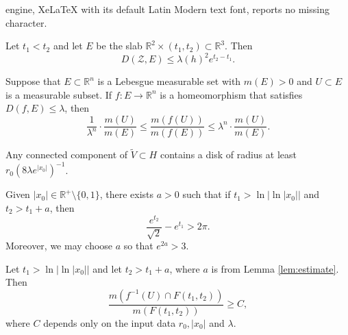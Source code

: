 \documentclass[10pt,a4paper]{amsart}
\newcommand{\R}{\mathbb{R}}
\begin{document}
engine, XeLaTeX with its default Latin Modern text font, reports no missing character.
\begin{lemma}
\label{lem:4}
Let $t_1<t_2$ and let $E$ be the slab $\R^2 \times (t_1,t_2) \subset \R^3$. Then 
\[ D(\mathcal{Z} , E) \leq \lambda(h)^2 e^{t_2-t_1}.\]
\end{lemma}

\begin{proposition}
    \label{prop:reldist}
Suppose that $E\subset \R^n$ is a Lebesgue measurable set with $m(E) > 0$ and $U \subset E$ is a measurable subset. If $f:E \to \R^n$ is a homeomorphism that satisfies $D(f,E) \leq \lambda$, then 
\[ \frac{1}{\lambda^n} \cdot \frac{m(U)}{m(E)} \leq \frac{ m(f(U))}{m(f(E))} \leq \lambda^n \cdot \frac{ m(U)}{m(E)}.  \]
\end{proposition}

\begin{lemma}
    \label{lem:radius}
Any connected component of $\widetilde{V} \subset H$ contains a disk of radius at least $r_0(8\lambda e^{|x_0|})^{-1}$.
\end{lemma}

\begin{lemma}
    \label{lem:estimate}
Given $|x_0| \in \R^+ \setminus  \{ 0 ,1 \}$, there exists $a>0$ such that if $t_1 > \ln \left |\ln |x_0| \right |$ and $t_2 > t_1+a$, then 
\[ \frac{e^{t_2}}{\sqrt{2}} - e^{t_1} > 2\pi .\]
Moreover, we may choose $a$ so that $e^{2a}>3$.
\end{lemma}

\begin{lemma}
\label{lem:doublepreims}
Let $t_1 > \ln \left |\ln |x_0| \right |$ and let $t_2 > t_1+a $, where $a$ is from Lemma \ref{lem:estimate}. Then 
\[ \frac{ m(f^{-1}(U) \cap F(t_1,t_2) ) }{m(F(t_1,t_2))} \geq C,\]
where $C$ depends only on the input data $r_0,|x_0|$ and $\lambda$.
\end{lemma}
\end{document}
